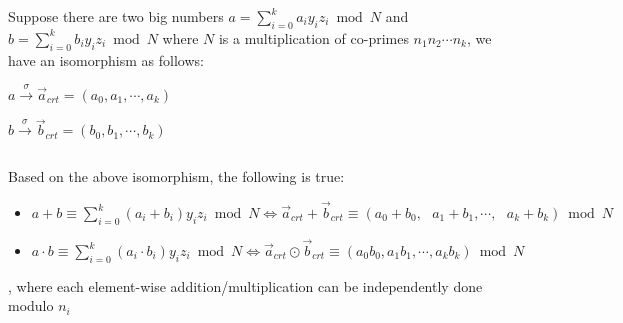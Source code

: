 \begin{tcolorbox}[title={\textbf{\tboxtheorem{\ref*{sec:chinese-remainder}.2} Application of the Chinese Remainder Theorem}}]

Suppose there are two big numbers $a = \sum\limits_{i=0}^k a_i y_i z_i \bmod N$ and $b = \sum\limits_{i=0}^k b_i y_i z_i \bmod N$  where $N$ is a multiplication of co-primes $n_1n_2\cdots n_k$, we have an isomorphism as follows:

$a \xrightarrow{\sigma} \vec{a}_{\mathit{crt}} = (a_0, a_1, \cdots, a_k)$

$b \xrightarrow{\sigma} \vec{b}_{\mathit{crt}} = (b_0, b_1, \cdots, b_k)$

$ $

Based on the above isomorphism, the following is true:

\begin{itemize}

\item $a + b \equiv \sum\limits_{i=0}^k (a_i + b_i) y_i z_i \bmod N \Longleftrightarrow \vec{a}_{\mathit{crt}} + \vec{b}_{\mathit{crt}} \equiv (a_0 + b_0, \text{ } a_1 + b_1, \cdots, \text{ } a_k + b_k) \bmod N$ 

\item $a \cdot b \equiv \sum\limits_{i=0}^k (a_i \cdot b_i) y_i z_i \bmod N \Longleftrightarrow \vec{a}_{\mathit{crt}} \odot \vec{b}_{\mathit{crt}} \equiv (a_0b_0, a_1 b_1, \cdots, a_k b_k)  \bmod N$ 


\end{itemize}



, where each element-wise addition/multiplication can be independently done modulo $n_i$

\end{tcolorbox}
